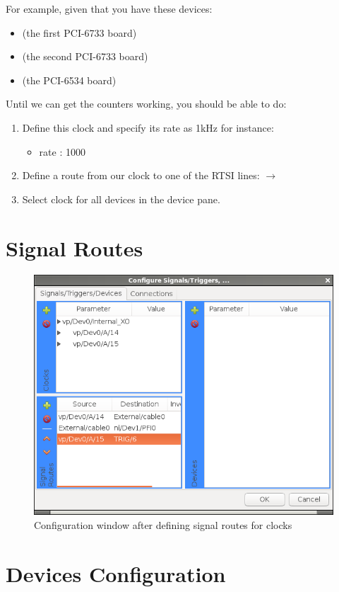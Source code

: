 For example, given that you have these devices:
\begin{itemize}
  \item {}  (the first PCI-6733 board)
  \item {}  (the second PCI-6733 board)
  \item {}  (the PCI-6534 board)
\end{itemize}
Until we can get the counters working, you should be able to do:
\begin{enumerate}
  \item Define this clock and specify its rate as 1kHz for instance:\\
          \begin{itemize}
            \item rate : 1000
          \end{itemize}
  \item Define a route from our clock to one of the RTSI lines:
          $\rightarrow$ 
  \item Select  clock for all devices in the
    device pane.
\end{enumerate}


\section{Signal Routes}\label{sec:devcfg:routes}

\begin{figure}[ht]
  \centerline{\includegraphics[width=.5\textwidth]{figures/routes-added}}
  \caption{Configuration window after defining signal routes for clocks}
  \label{fig:devcfg:routes-added}
\end{figure}


\section{Devices Configuration}\label{sec:devcfg:devices}
